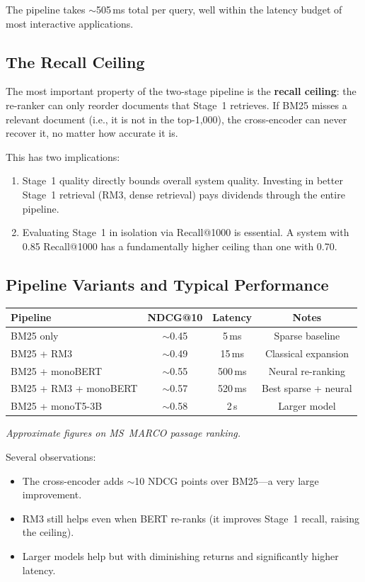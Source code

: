 \documentclass[11pt,a4paper]{article}
\theoremstyle{definition}
\theoremstyle{plain}
\begin{document}
The pipeline takes $\sim$505\,ms total per query, well within the latency budget of most interactive applications.

\subsection{The Recall Ceiling}

The most important property of the two-stage pipeline is the \textbf{recall ceiling}: the re-ranker can only reorder documents that Stage~1 retrieves. If BM25 misses a relevant document (i.e., it is not in the top-1{,}000), the cross-encoder can never recover it, no matter how accurate it is.

This has two implications:
\begin{enumerate}
    \item Stage~1 quality directly bounds overall system quality. Investing in better Stage~1 retrieval (RM3, dense retrieval) pays dividends through the entire pipeline.
    \item Evaluating Stage~1 in isolation via Recall@1000 is essential. A system with 0.85 Recall@1000 has a fundamentally higher ceiling than one with 0.70.
\end{enumerate}

\subsection{Pipeline Variants and Typical Performance}

\begin{center}
\small
\begin{tabular}{lccc}
\toprule
\textbf{Pipeline} & \textbf{NDCG@10} & \textbf{Latency} & \textbf{Notes} \\
\midrule
BM25 only & $\sim$0.45 & 5\,ms & Sparse baseline \\
BM25 + RM3 & $\sim$0.49 & 15\,ms & Classical expansion \\
BM25 + monoBERT & $\sim$0.55 & 500\,ms & Neural re-ranking \\
BM25 + RM3 + monoBERT & $\sim$0.57 & 520\,ms & Best sparse + neural \\
BM25 + monoT5-3B & $\sim$0.58 & 2\,s & Larger model \\
\bottomrule
\end{tabular}
\end{center}

\textit{Approximate figures on MS~MARCO passage ranking.}

Several observations:
\begin{itemize}
    \item The cross-encoder adds $\sim$10 NDCG points over BM25---a very large improvement.
    \item RM3 still helps even when BERT re-ranks (it improves Stage~1 recall, raising the ceiling).
    \item Larger models help but with diminishing returns and significantly higher latency.
\end{itemize}
\end{document}
